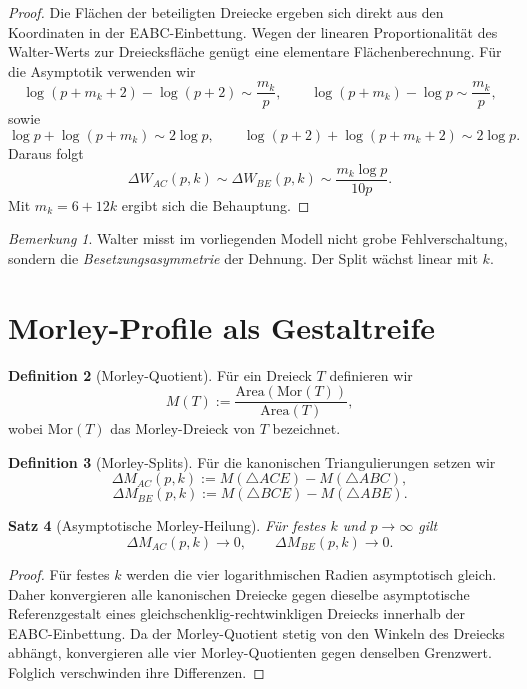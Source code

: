 \documentclass[11pt,a4paper]{article}
\newtheorem{satz}{Satz}
\theoremstyle{definition}
\newtheorem{definition}[satz]{Definition}
\theoremstyle{remark}
\newtheorem{bemerkung}[satz]{Bemerkung}
\newcommand{\Area}{\mathrm{Area}}
\newcommand{\Mor}{\mathrm{Mor}}
\begin{document}
\begin{proof}
Die Flächen der beteiligten Dreiecke ergeben sich direkt aus den Koordinaten in der EABC-Einbettung. Wegen der linearen Proportionalität des Walter-Werts zur Dreiecksfläche genügt eine elementare Flächenberechnung. Für die Asymptotik verwenden wir
\[
\log(p+m_k+2)-\log(p+2)\sim \frac{m_k}{p},
\qquad
\log(p+m_k)-\log p\sim \frac{m_k}{p},
\]
sowie
\[
\log p+\log(p+m_k)\sim 2\log p,\qquad
\log(p+2)+\log(p+m_k+2)\sim 2\log p.
\]
Daraus folgt
\[
\Delta W_{AC}(p,k)\sim \Delta W_{BE}(p,k)\sim \frac{m_k\log p}{10p}.
\]
Mit $m_k=6+12k$ ergibt sich die Behauptung.
\end{proof}

\begin{bemerkung}
Walter misst im vorliegenden Modell nicht grobe Fehlverschaltung, sondern die \emph{Besetzungsasymmetrie} der Dehnung. Der Split wächst linear mit $k$.
\end{bemerkung}

\section{Morley-Profile als Gestaltreife}

\begin{definition}[Morley-Quotient]
Für ein Dreieck $T$ definieren wir
\[
M(T):=\frac{\Area(\Mor(T))}{\Area(T)},
\]
wobei $\Mor(T)$ das Morley-Dreieck von $T$ bezeichnet.
\end{definition}

\begin{definition}[Morley-Splits]
Für die kanonischen Triangulierungen setzen wir
\[
\Delta M_{AC}(p,k):=M(\triangle ACE)-M(\triangle ABC),
\]
\[
\Delta M_{BE}(p,k):=M(\triangle BCE)-M(\triangle ABE).
\]
\end{definition}

\begin{satz}[Asymptotische Morley-Heilung]
Für festes $k$ und $p\to\infty$ gilt
\[
\Delta M_{AC}(p,k)\to 0,\qquad \Delta M_{BE}(p,k)\to 0.
\]
\end{satz}

\begin{proof}
Für festes $k$ werden die vier logarithmischen Radien asymptotisch gleich. Daher konvergieren alle kanonischen Dreiecke gegen dieselbe asymptotische Referenzgestalt eines gleichschenklig-rechtwinkligen Dreiecks innerhalb der EABC-Einbettung. Da der Morley-Quotient stetig von den Winkeln des Dreiecks abhängt, konvergieren alle vier Morley-Quotienten gegen denselben Grenzwert. Folglich verschwinden ihre Differenzen.
\end{proof}
\end{document}
